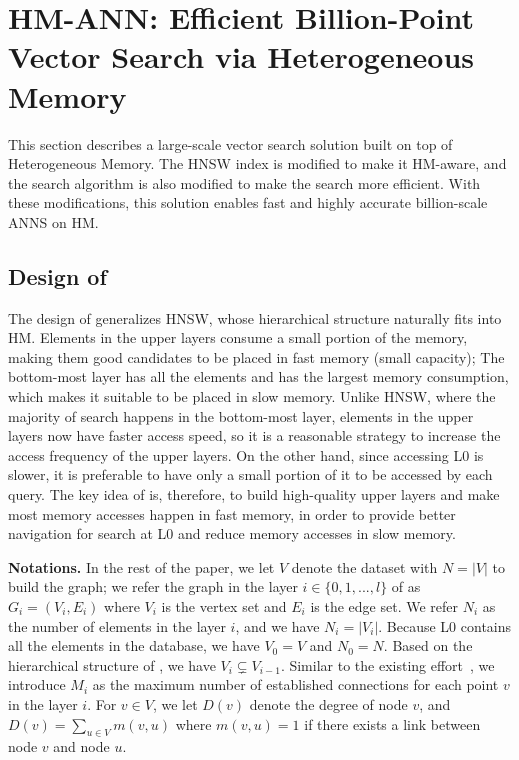 \section{HM-ANN: Efficient Billion-Point Vector Search via Heterogeneous Memory}
\label{sec:hmann}

This section describes a large-scale vector search solution built on top of Heterogeneous Memory. The HNSW index is modified to make it HM-aware, and the search algorithm is also modified to make the search more efficient. With these modifications, this solution enables fast and highly accurate billion-scale ANNS on HM.

\subsection{Design of \name}

The design of \algoname generalizes HNSW, whose hierarchical structure naturally fits into HM. Elements in the upper layers consume a small portion of the memory, making them good candidates to be placed in fast memory (small capacity); The bottom-most layer has all the elements and has the largest memory consumption, which makes it suitable to be placed in slow memory. Unlike HNSW, where the majority of search happens in the bottom-most layer, elements in the upper layers now have faster access speed, so it is a reasonable strategy to increase the access frequency of the upper layers. On the other hand, since accessing L0 is slower, it is preferable to have only a small portion of it to be accessed by each query. The key idea of \algoname is, therefore, to build high-quality upper layers and make most memory accesses happen in fast memory, in order to provide better navigation for search at L0 and reduce memory accesses in slow memory.

\textbf{Notations.} In the rest of the paper, we let $V$ denote the dataset with $N=|V|$ to build the graph; we refer the graph in the layer $i \in \{0, 1,...,l\}$ of \name as $G_i = (V_i, E_i)$ where $V_i$ is the vertex set and $E_i$ is the edge set. We refer $N_i$ as the number of elements in the layer $i$, and we have $N_i=|V_i|$. Because L0 contains all the elements in the database, we have $V_0 = V$ and $N_0 = N$. Based on the hierarchical structure of \name, we have $ V_i \subsetneq V_{i-1}$.  Similar to the existing effort~\cite{hnsw}, we introduce $M_i$ as the maximum number of established connections for each point $v$ in the layer $i$. For $v \in V$, we let $D(v) $ denote the degree of node $v$, and $D(v) = \sum_{u \in V} m(v,u)$ where $m(v,u)=1$ if there exists a link between node $v$ and node $u$.

